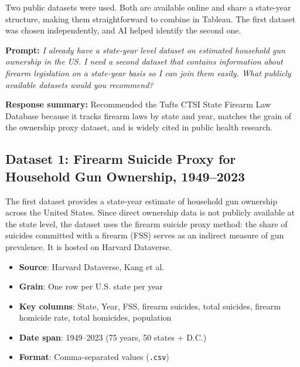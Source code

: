 \documentclass[a4paper,11pt]{article}
\renewenvironment{quote}
  {\begin{mdframed}[style=promptbox]\small}
  {\end{mdframed}}
\begin{document}
\par
Two public datasets were used. Both are available online and share a
state-year structure, making them straightforward to combine in Tableau.
The first dataset was chosen independently, and AI helped identify the second one.

\begin{quote}
	\textbf{Prompt:} \textit{I already have a state-year level dataset on
		estimated household gun ownership in the US. I need a second dataset that
		contains information about firearm legislation on a state-year basis so I
		can join them easily. What publicly available datasets would you recommend?}
\end{quote}

\begin{quote}
	\textbf{Response summary:} Recommended the Tufts CTSI State Firearm Law
	Database because it tracks firearm laws by state and year, matches the grain
	of the ownership proxy dataset, and is widely cited in public health research.
\end{quote}

\subsection{Dataset 1: Firearm Suicide Proxy for Household Gun Ownership, 1949--2023}

\par
The first dataset\autocite{ownershipproxy} provides a state-year estimate of
household gun ownership across the United States. Since direct ownership data
is not publicly available at the state level, the dataset uses the firearm
suicide proxy method: the share of suicides committed with a firearm (FSS)
serves as an indirect measure of gun prevalence. It is hosted on Harvard
Dataverse.

\begin{itemize}
	\item \textbf{Source}: Harvard Dataverse, Kang et al.\autocite{kang2023}
	\item \textbf{Grain}: One row per U.S. state per year
	\item \textbf{Key columns}: State, Year, FSS, firearm suicides, total suicides,
	      firearm homicide rate, total homicides, population
	\item \textbf{Date span}: 1949--2023 (75 years, 50 states + D.C.)
	\item \textbf{Format}: Comma-separated values (\texttt{.csv})
\end{itemize}
\end{document}
